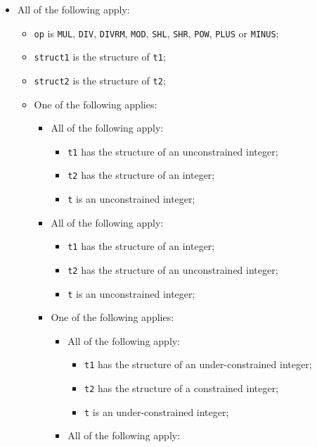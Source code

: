 \documentclass{book}
\begin{document}
\begin{itemize}
  \item All of the following apply:
    \begin{itemize}
    \item \texttt{op} is \texttt{MUL}, \texttt{DIV}, \texttt{DIVRM}, \texttt{MOD}, \texttt{SHL}, \texttt{SHR}, \texttt{POW}, \texttt{PLUS} or \texttt{MINUS};
    \item \texttt{struct1} is the structure of \texttt{t1};
    \item \texttt{struct2} is the structure of \texttt{t2};
    \item One of the following applies:
      \begin{itemize}
      \item All of the following apply:
        \begin{itemize}
        \item \texttt{t1} has the structure of an unconstrained integer;
        \item \texttt{t2} has the structure of an integer;
        \item \texttt{t} is an unconstrained integer;
        \end{itemize}
      \item All of the following apply:
        \begin{itemize}
        \item \texttt{t1} has the structure of an integer;
        \item \texttt{t2} has the structure of an unconstrained integer;
        \item \texttt{t} is an unconstrained integer;
        \end{itemize}
      \item One of the following applies: 
       \begin{itemize} 
       \item All of the following apply:
          \begin{itemize}
          \item \texttt{t1} has the structure of an under-constrained integer;
          \item \texttt{t2} has the structure of a constrained integer;
          \item \texttt{t} is an under-constrained integer;
          \end{itemize}
        \item All of the following apply:
          \begin{itemize}

\end{itemize}
\end{itemize}
\end{itemize}
\end{itemize}
\end{itemize}
\end{document}
